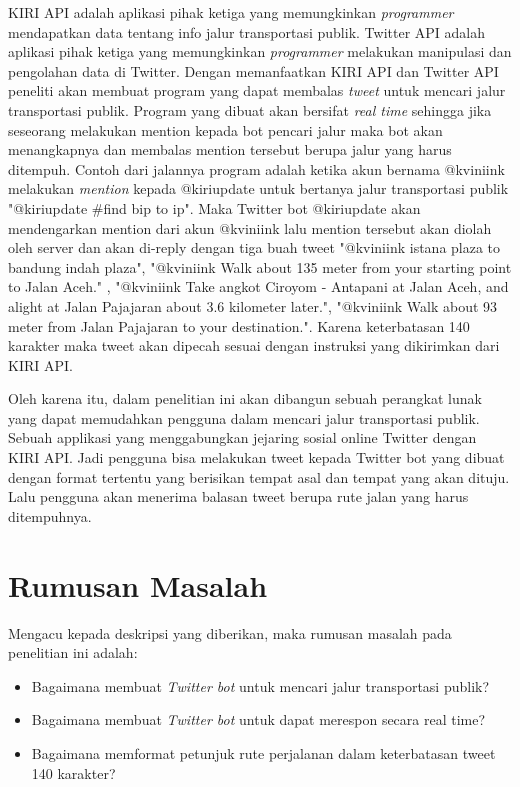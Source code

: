 KIRI API adalah aplikasi pihak ketiga yang memungkinkan \textit{programmer} mendapatkan data tentang info jalur transportasi publik. Twitter API adalah aplikasi pihak ketiga yang memungkinkan \textit{programmer} melakukan manipulasi dan pengolahan data di Twitter. Dengan memanfaatkan KIRI API dan Twitter API peneliti akan membuat program yang dapat membalas \textit{tweet} untuk mencari jalur transportasi publik. Program yang dibuat akan bersifat \textit{real time} sehingga jika seseorang melakukan mention kepada bot pencari jalur maka bot akan menangkapnya dan membalas mention tersebut berupa jalur yang harus ditempuh. Contoh dari jalannya program adalah ketika akun bernama @kviniink melakukan \textit{mention} kepada @kiriupdate untuk bertanya jalur transportasi publik "@kiriupdate \#find bip to ip". Maka Twitter bot @kiriupdate akan mendengarkan mention dari akun @kviniink lalu mention tersebut akan diolah oleh server dan akan di-reply dengan tiga buah tweet "@kviniink istana plaza to bandung indah plaza", "@kviniink Walk about 135 meter from your starting point to Jalan Aceh." , "@kviniink Take angkot Ciroyom - Antapani at Jalan Aceh, and alight at Jalan Pajajaran about 3.6 kilometer later.", "@kviniink Walk about 93 meter from Jalan Pajajaran to your destination.". Karena keterbatasan 140 karakter maka tweet akan dipecah sesuai dengan instruksi yang dikirimkan dari KIRI API.

Oleh karena itu, dalam penelitian ini akan dibangun sebuah perangkat lunak yang dapat memudahkan pengguna dalam mencari jalur transportasi publik. Sebuah applikasi yang menggabungkan jejaring sosial online Twitter dengan KIRI API. Jadi pengguna bisa melakukan tweet kepada Twitter bot yang dibuat dengan format tertentu yang berisikan tempat asal dan tempat yang akan dituju. Lalu pengguna akan menerima balasan tweet berupa rute jalan yang harus ditempuhnya.

\section{Rumusan Masalah}
Mengacu kepada deskripsi yang diberikan, maka rumusan masalah pada penelitian ini adalah:
\begin{itemize}
	\item Bagaimana membuat \textit{Twitter bot} untuk mencari jalur transportasi publik?
	\item Bagaimana membuat \textit{Twitter bot} untuk dapat merespon secara real time?
	\item Bagaimana memformat petunjuk rute perjalanan dalam keterbatasan tweet 140 karakter?
\end{itemize}


